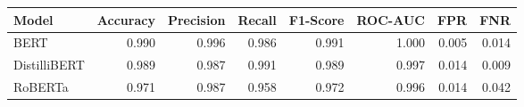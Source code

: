 \begin{tabular}{|l||r|r|r|r|r|r|r|}
\toprule
Model & \textbf{Accuracy} & \textbf{Precision} & Recall & \textbf{F1-Score} & \textbf{ROC-AUC} & \textbf{FPR} & FNR \\
\midrule \midrule
BERT & 0.990 & 0.996 & 0.986 & 0.991 & 1.000 & 0.005 & 0.014 \\
DistilliBERT & 0.989 & 0.987 & 0.991 & 0.989 & 0.997 & 0.014 & 0.009 \\
RoBERTa & 0.971 & 0.987 & 0.958 & 0.972 & 0.996 & 0.014 & 0.042 \\
\bottomrule
\end{tabular}
